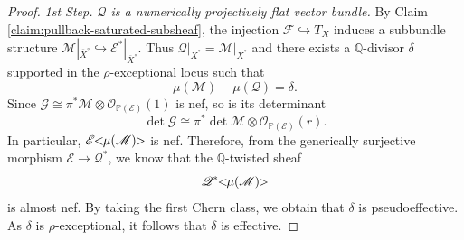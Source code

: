 \documentclass[english,reqno]{amsart}
\newcommand\bbP{{\mathbb P}}
\newcommand\bbQ{{\mathbb Q}}
\newcommand\sE{{\mathscr E}}
\newcommand\sF{{\mathscr F}}
\newcommand\sG{{\mathscr G}}
\newcommand\sM{{\mathscr M}}
\newcommand\sO{{\mathscr O}}
\newcommand\sQ{{\mathscr Q}}
\theoremstyle{plain}
\theoremstyle{definition}
\numberwithin{equation}{section} %
\begin{document}
\begin{proof}
	
	
	
	
	\textit{1st  Step. $\sQ$ is a numerically projectively flat vector bundle.}
	By Claim \ref{claim:pullback-saturated-subsheaf}, the injection $\sF \hookrightarrow T_X$ induces  a subbundle  structure $\sM|_{\overline{X}^\circ} \hookrightarrow \sE^*|_{\overline{X}^\circ}$.
	Thus $\sQ\vert_{\overline{X}^\circ} = \sM\vert_{\overline{X}^\circ}$ and there exists a $\bbQ$-divisor $\delta$ supported in the $\rho$-exceptional locus  such that 
	$$
	\mu(\sM)-\mu(\sQ) = \delta.
	$$	
	Since $\sG\cong \pi^*\sM\otimes\sO_{\bbP(\sE)}(1)$ is nef, so is its determinant 
	$$
	\det \sG \cong \pi^*\det \sM \otimes \sO_{\bbP(\sE)}(r).
	$$  
	In particular, $\sE\hspace{-0.8ex}<\hspace{-0.8ex}\mu(\sM)\hspace{-0.8ex}>$ is nef. Therefore,  from the generically surjective morphism $\sE \to \sQ^*$, we know that the $\mathbb{Q}$-twisted sheaf
	\[
	\sQ^*\hspace{-0.8ex}<\hspace{-0.8ex}\mu(\sM)\hspace{-0.8ex}>
	\]
	is almost nef. By taking the first Chern class, we obtain that $\delta$ is pseudoeffective. As $\delta$ is $\rho$-exceptional, it follows that $\delta$ is effective.
	
	
	

\end{proof}
\end{document}
